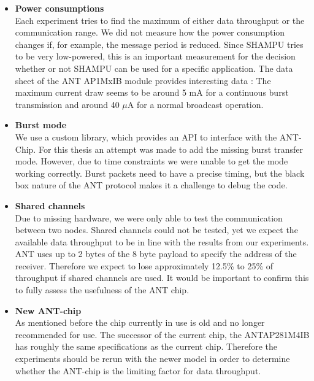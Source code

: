 \begin{itemize}
	\item{\textbf{Power consumptions}} \hfill \\ Each experiment tries to find the maximum of either data throughput or the communication range. We did not measure how the power consumption changes if, for example, the message period is reduced. Since SHAMPU tries to be very low-powered, this is an important measurement for the decision whether or not SHAMPU can be used for a specific application. The data sheet of the ANT AP1MxIB module provides interesting data \cite{Networks}: The maximum current draw seems to be around 5 mA for a continuous burst transmission and around 40 $\mu$A for a normal broadcast operation.
	
	\item{\textbf{Burst mode}} \hfill \\ We use a custom library, which provides an API to interface with the ANT-Chip. For this thesis an attempt was made to add the missing burst transfer mode. However, due to time constraints we were unable to get the mode working correctly. Burst packets need to have a precise timing, but the black box nature of the ANT protocol makes it a challenge to debug the code.
	
	\item{\textbf{Shared channels}} \hfill \\ Due to missing hardware, we were only able to test the communication between two nodes. Shared channels could not be tested, yet we expect the available data throughput to be in line with the results from our experiments. ANT uses up to 2 bytes of the 8 byte payload to specify the address of the receiver. Therefore we expect to lose approximately 12.5\% to 25\% of throughput if shared channels are used. It would be important to confirm this to fully assess the usefulness of the ANT chip.
	
	\item{\textbf{New ANT-chip}} \hfill \\ As mentioned before the chip currently in use is old and no longer recommended for use. The successor of the current chip, the ANTAP281M4IB has roughly the same specifications as the current chip. Therefore the experiments should be rerun with the newer model in order to determine whether the ANT-chip is the limiting factor for data throughput.
\end{itemize}
